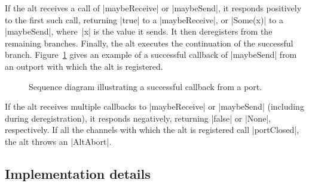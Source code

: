 If the alt receives a call of |maybeReceive| or |maybeSend|, it responds
positively to the first such call, returning |true| to a |maybeReceive|, or
|Some(x)| to a |maybeSend|, where~|x| is the value it sends.  It then
deregisters from the remaining branches.  
%
Finally, the alt
executes the continuation of the successful branch.
%
Figure~\ref{fig:alt-2} gives an example of a successful callback of
|maybeSend| from an outport with which the alt is registered.

\begin{figure}
\begin{center}
\def\height{7.5} %
\def\gap{3.5} %
\end{center}
\caption{Sequence diagram illustrating a successful callback from a
  port.  \label{fig:alt-2}}
\end{figure}


If the alt receives multiple callbacks to |maybeReceive| or |maybeSend|
(including during deregistration), it responds negatively, returning |false|
or |None|, respectively.
%
If all the channels with which the alt is registered call |portClosed|, the
alt throws an |AltAbort|. 


\subsection{Implementation details}

